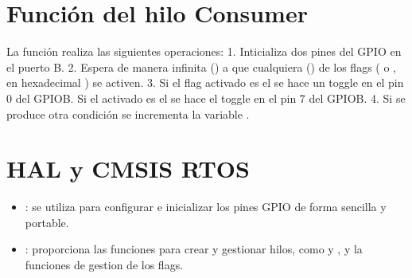 \documentclass[letterpaper,10pt,english]{sphinxmanual}
\begin{document}
\section{Función del hilo Consumer}
\label{\detokenize{ejemplothreads-flags:funcion-del-hilo-consumer}}
\sphinxAtStartPar
La función  realiza las siguientes operaciones:
1. Inticializa  dos pines del GPIO en el puerto B.
2. Espera de manera infinita () a que cualquiera  () de los flags ( o , en hexadecimal ) se activen.
3. Si el flag activado es el  se hace un toggle en el pin 0 del GPIOB. Si el activado es el  se hace el toggle en el pin 7 del GPIOB.
4. Si se produce otra condición se incrementa la variable .


\section{HAL y CMSIS RTOS}
\label{\detokenize{ejemplothreads-flags:hal-y-cmsis-rtos}}\begin{itemize}
\item {} 
\sphinxAtStartPar
{}: se utiliza para configurar e inicializar los pines GPIO de forma sencilla y portable.

\item {} 
\sphinxAtStartPar
{}: proporciona las funciones para crear y gestionar hilos, como  y , y la funciones de gestion de los flags.

\end{itemize}
\end{document}
